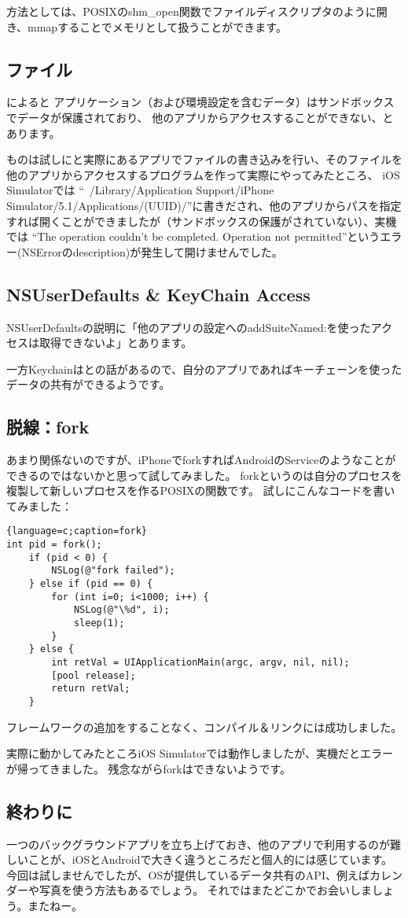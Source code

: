 方法としては、POSIXのshm\_open関数でファイルディスクリプタのように開き、mmapすることでメモリとして扱うことができます。

\subsection{ファイル}
によると
アプリケーション（および環境設定を含むデータ）はサンドボックスでデータが保護されており、
他のアプリからアクセスすることができない、とあります。

ものは試しにと実際にあるアプリでファイルの書き込みを行い、そのファイルを他のアプリからアクセスするプログラムを作って実際にやってみたところ、
iOS Simulatorでは
``~/Library/Application Support/iPhone Simulator/5.1/Applications/(UUID)/''に書きだされ、他のアプリからパスを指定すれば開くことができましたが（サンドボックスの保護がされていない）、実機では
``The operation couldn't be completed. Operation not permitted''というエラー(NSErrorのdescription)が発生して開けませんでした。

\subsection{NSUserDefaults \& KeyChain Access}
NSUserDefaultsの説明に「他のアプリの設定へのaddSuiteNamed:を使ったアクセスは取得できないよ」とあります。

一方Keychainはとの話があるので、自分のアプリであればキーチェーンを使ったデータの共有ができるようです。

\subsection{脱線：fork}
あまり関係ないのですが、iPhoneでforkすればAndroidのServiceのようなことができるのではないかと思って試してみました。
forkというのは自分のプロセスを複製して新しいプロセスを作るPOSIXの関数です。
試しにこんなコードを書いてみました：
\begin{lstlisting}{language=c;caption=fork}
int pid = fork();
	if (pid < 0) {
		NSLog(@"fork failed");
	} else if (pid == 0) {
		for (int i=0; i<1000; i++) {
			NSLog(@"\%d", i);
			sleep(1);
		}
	} else {
		int retVal = UIApplicationMain(argc, argv, nil, nil);
		[pool release];
		return retVal;
	}
\end{lstlisting}
フレームワークの追加をすることなく、コンパイル＆リンクには成功しました。

実際に動かしてみたところiOS Simulatorでは動作しましたが、実機だとエラーが帰ってきました。
残念ながらforkはできないようです。

\subsection{終わりに}
一つのバックグラウンドアプリを立ち上げておき、他のアプリで利用するのが難しいことが、iOSとAndroidで大きく違うところだと個人的には感じています。
今回は試しませんでしたが、OSが提供しているデータ共有のAPI、例えばカレンダーや写真を使う方法もあるでしょう。
それではまたどこかでお会いしましょう。またねー。
